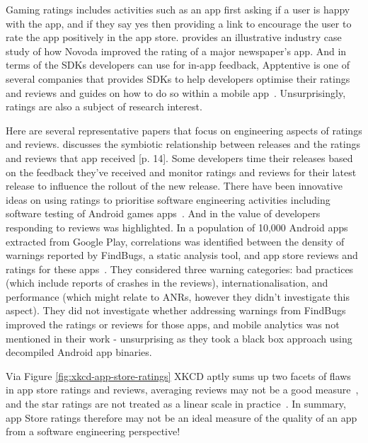 Gaming ratings includes activities such as an app first asking if a user is happy with the app, and if they say yes then providing a link to encourage the user to rate the app positively in the app store. \citet{novoda_akan2016_asking_for_app_feedback_the_effective_way} provides an illustrative industry case study of how Novoda improved the rating of a major newspaper's app. And in terms of the SDKs developers can use for in-app feedback, Apptentive is one of several companies that provides SDKs to help developers optimise their ratings and reviews and guides on how to do so within a mobile app~\citep{walz2015_apptentive_the_mobile_marketers_guide_to_app_store_ratings_and_reviews}. Unsurprisingly, ratings are also a subject of research interest.

Here are several representative papers that focus on engineering aspects of ratings and reviews.  \citet{alsubaihin2019app_store_effects_on_software_engineering} discusses the symbiotic relationship between releases and the ratings and reviews that app received [p. 14]. Some developers time their releases based on the feedback they've received and monitor ratings and reviews for their latest release to influence the rollout of the new release. There have been innovative ideas on using ratings to prioritise software engineering activities including software testing of Android games apps~\citep{khalid2014_prioritizing_the_devices_to_test_your_app_on_casestudy_android_games}. And in \citet{greenheld2018_automating_developers_responses_to_app_reviews} the value of developers responding to reviews was highlighted. 
In a population of 10,000 Android apps extracted from Google Play, correlations was identified between the density of warnings reported by FindBugs, a static analysis tool, and app store reviews and ratings for these apps~\citep{khalid2016_examining_the_relationship_between_findbugs_warnings_and_app_ratings}. They considered three warning categories: bad practices (which include reports of crashes in the reviews), internationalisation, and performance (which might relate to ANRs, however they didn't investigate this aspect). They did not investigate whether addressing warnings from FindBugs improved the ratings or reviews for those apps, and mobile analytics was not mentioned in their work - unsurprising as they took a black box approach using decompiled Android app binaries.

Via Figure \ref{fig:xkcd-app-store-ratings} XKCD aptly sums up two facets of flaws in app store ratings and reviews, averaging reviews may not be a good measure~\citep{explainxkcd_937_tornadoguard}, and the star ratings are not treated as a linear scale in practice~\citep{explainxkcd_1098_star_ratings}. In summary, app Store ratings therefore may not be an ideal measure of the quality of an app from a software engineering perspective! 

